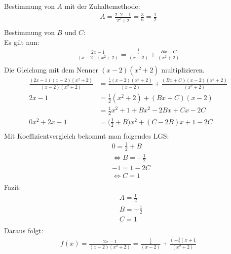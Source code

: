 Bestimmung von $ A $ mit der Zuhaltemethode:\\
\begin{align*}
A=\frac{2\cdot 2-1}{2^2+2}=\frac{3}{6}=\frac{1}{2}\\
\end{align*}
Bestimmung von $ B $ und $ C $:\\
Es gilt nun:\\
\begin{align*}
\frac{2x-1}{(x-2)(x^2+2)}=\frac{\frac{1}{2}}{(x-2)}+\frac{Bx+C}{(x^2+2)}\\
\end{align*}
Die Gleichung mit dem Nenner $ (x-2)(x^2+2) $ multiplizieren.\\
\begin{align*}
\frac{(2x-1)(x-2)(x^2+2)}{(x-2)(x^2+2)}&=\frac{\frac{1}{2}(x-2)(x^2+2)}{(x-2)}+\frac{(Bx+C)(x-2)(x^2+2)}{(x^2+2)}\\
2x-1&=\frac{1}{2}(x^2+2)+(Bx+C)(x-2)\\
&=\frac{1}{2}x^2 +1+Bx^2-2Bx+Cx-2C\\
0x^2+2x-1&=\bigg(\frac{1}{2}+B\bigg)x^2+(C-2B)x+1-2C\\
\end{align*}
Mit Koeffizientvergleich bekommt man folgendes LGS:\\
\begin{align*}
&0=\frac{1}{2}+B\\
&\Leftrightarrow B=-\frac{1}{2}\\
&-1=1-2C\\
&\Leftrightarrow C=1\\
\end{align*}
Fazit:\\
\begin{align*}
&A=\frac{1}{2}\\
&B=-\frac{1}{2}\\
&C=1\\
\end{align*}
Daraus folgt:\\
\begin{align*}
f(x)=\frac{2x-1}{(x-2)(x^2+2)}=\frac{\frac{1}{2}}{(x-2)}+\frac{(-\frac{1}{2})x+1}{(x^2+2)}
\end{align*}
